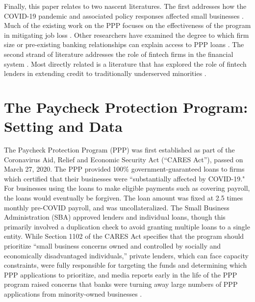 \documentclass[11pt]{article}
\begin{document}
Finally, this paper relates to two nascent literatures. The first addresses how the COVID-19 pandemic and associated policy responses affected small businesses \citep{alekseev2020, bartik2020impact,fairlie2020, greenwood2020sizing, kim2020revenue}. Much of the  existing work on the PPP focuses on the effectiveness of the program in mitigating job loss \citep{hubbard2020has, faulkender2020job, granja2020, autor2020, bartik2020targeting, barraza2020short,bartlett2020small}. Other researchers have examined the degree to which firm size or pre-existing banking relationships can explain access to PPP loans \citep{humphries2020information, li2020supplies}. The second strand of literature addresses the role of fintech firms in the financial system \citep{seru2019regulating,philippon2019fintech, fedann, fedfintech, gopal2020rise}. Most directly related is a literature that has explored the role of fintech lenders in extending credit to traditionally underserved minorities \citep{tang2019peer, balyuk2020fueling,bartlett2019consumer, fuster2019role, buchak2018fintech, berg2020rise, d2020costly}.



\section{The Paycheck Protection Program: Setting and Data} \label{data}

The Paycheck Protection Program (PPP) was first established as part of the Coronavirus Aid, Relief and Economic Security Act (“CARES Act”), passed on March 27, 2020. The PPP provided 100\% government-guaranteed loans to firms which certified that their businesses were “substantially affected by COVID-19." For businesses using the loans to make eligible payments such as covering payroll, the loans would eventually be forgiven. The loan amount was fixed at 2.5 times monthly pre-COVID payroll, and was uncollateralized. The Small Business Administration (SBA) approved lenders and individual loans, though this primarily involved a duplication check to avoid granting multiple loans to a single entity. While Section 1102 of the CARES Act specifies that the program should prioritize ``small business concerns owned and controlled by socially and economically disadvantaged individuals,'' private lenders, which can face capacity constraints, were fully responsible for targeting the funds and determining which PPP applications to prioritize, and media reports early in the life of the PPP program raised concerns that banks were turning away large numbers of PPP applications from minority-owned businesses \citep{wsjppp,vox_article,forbes_article}. 
\end{document}
